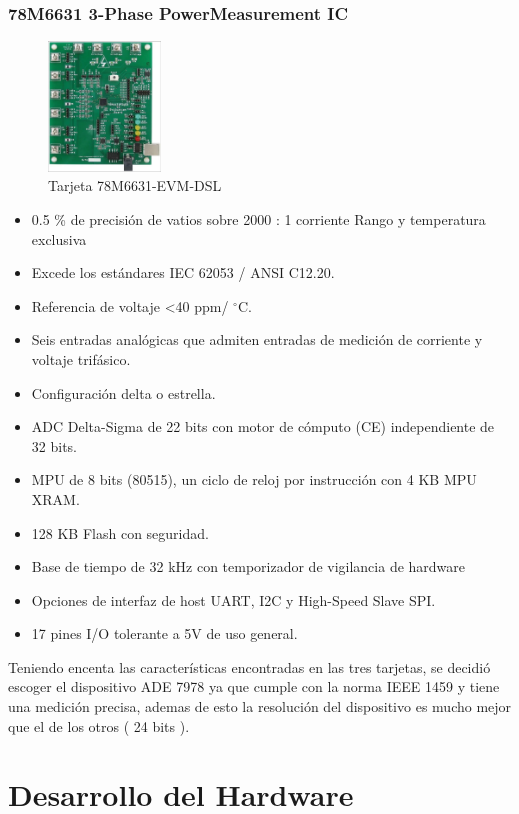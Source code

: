 \subsubsection{78M6631 3-Phase PowerMeasurement IC}
\begin{figure}[H]
\centering
\includegraphics[width = 3cm]{3Proyecto/78M6631-EVM-DSL}
\caption{Tarjeta 78M6631-EVM-DSL}
\label{fig:78M6631-EVM-DSL}
\end{figure}
\begin{itemize}
\itemsep0em
\item 0.5 \% de precisión de vatios sobre 2000 : 1 corriente Rango y temperatura exclusiva
\item Excede los estándares IEC 62053 / ANSI C12.20.
\item Referencia de voltaje <40 ppm/ $^{\circ}$C.
\item Seis entradas analógicas que admiten entradas de medición de corriente y voltaje trifásico.
\item Configuración delta o estrella.
\item ADC Delta-Sigma de 22 bits con motor de cómputo (CE) independiente de 32 bits.
\item MPU de 8 bits (80515), un ciclo de reloj por instrucción con 4 KB MPU XRAM.
\item 128 KB Flash con seguridad.
\item Base de tiempo de 32 kHz con temporizador de vigilancia de hardware
\item Opciones de interfaz de host UART, I2C y High-Speed Slave SPI.
\item 17 pines I/O tolerante a 5V de uso general.
\end{itemize}

Teniendo encenta las características encontradas en las tres tarjetas, se decidió escoger el dispositivo ADE 7978 ya que cumple con la norma IEEE 1459 y tiene una medición precisa, ademas de esto la resolución del dispositivo es mucho mejor que el de los otros ( 24 bits ).
\section{Desarrollo del Hardware}
